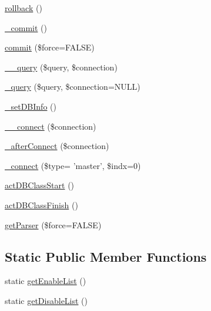\begin{DoxyCompactItemize}
\hyperlink{classDB_a1fb6903379bc241fd318b980b9e30882}{rollback} ()
\item 
\hyperlink{classDB_ae6b44dc80d78b7f73cb6741ff0d63399}{\-\_\-commit} ()
\item 
\hyperlink{classDB_a9e84ef91b522b1cd4d1f0f9a3fe3a57a}{commit} (\$force=F\-A\-L\-S\-E)
\item 
\hyperlink{classDB_a9e93ad499d34fefc40686d35ed9bf18f}{\-\_\-\-\_\-query} (\$query, \$connection)
\item 
\hyperlink{classDB_a740ea0f536b5ffacabf31b3a7473f5a7}{\-\_\-query} (\$query, \$connection=N\-U\-L\-L)
\item 
\hyperlink{classDB_a92f2478aeb03b00432332ad4e4a3d700}{\-\_\-set\-D\-B\-Info} ()
\item 
\hyperlink{classDB_a398b5d8142cab5920d3e037b4f22830e}{\-\_\-\-\_\-connect} (\$connection)
\item 
\hyperlink{classDB_ae9511581ab1229970e061e599b0f2f94}{\-\_\-after\-Connect} (\$connection)
\item 
\hyperlink{classDB_aaa2d517ff3b233e36c7873f288cb38ba}{\-\_\-connect} (\$type= 'master', \$indx=0)
\item 
\hyperlink{classDB_a5aa10d0d5f40cbd7c9b20a84b1c1c307}{act\-D\-B\-Class\-Start} ()
\item 
\hyperlink{classDB_abcdbf61ef5e7c96725c7ea2781f165f4}{act\-D\-B\-Class\-Finish} ()
\item 
\hyperlink{classDB_abbcecd47d956cd069e3caa45c600dda4}{get\-Parser} (\$force=F\-A\-L\-S\-E)
\end{DoxyCompactItemize}
\subsection*{Static Public Member Functions}
\begin{DoxyCompactItemize}
\item 
static \hyperlink{classDB_af0a19b274727d2230af068eec4877664}{get\-Enable\-List} ()
\item 
static \hyperlink{classDB_a4c1e96ac1c1ba247fc147b5bc7d99cbe}{get\-Disable\-List} ()
\end{DoxyCompactItemize}
